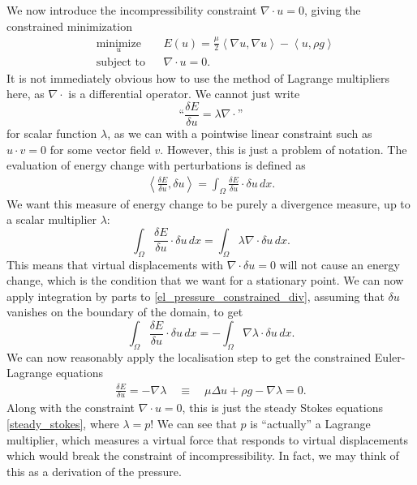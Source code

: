 \documentclass[11pt,a4paper]{memoir}
\newcommand{\inner}[1]{\left<#1\right>}
\newcommand{\om}{{\Omega}}
\begin{document}
We now introduce the incompressibility constraint $\nabla \cdot u = 0$, giving the constrained minimization
\begin{equation}\label{stokes_flow_optimization}
\begin{aligned}
& \underset{u}{\text{minimize}}
& & E(u) =  \frac{\mu}{2} \inner{\nabla u, \nabla u} - \inner{u, \rho g}\\
& \text{subject to}
& & \nabla\cdot u = 0.
\end{aligned}
\end{equation}
It is not immediately obvious how to use the method of Lagrange multipliers here, as $\nabla\cdot$ is a differential operator.
We cannot just write
    $$\text{``}\frac{\delta E}{\delta u} = \lambda\nabla\cdot\text{''}$$
for scalar function $\lambda$, as we can with a pointwise linear constraint such as $u\cdot v = 0$ for some vector field $v$. However, this is just a problem of
notation. The evaluation of energy change with perturbations is defined as
\begin{align*}
    \inner{\frac{\delta E}{\delta u}, \delta u} = \int_\Omega \frac{\delta E}{\delta u}\cdot\delta u\,dx.
\end{align*}
We want this measure of energy change to be purely a divergence measure, up to a scalar multiplier $\lambda$:
\begin{equation}\label{el_pressure_constrained_div}
    \int_\Omega \frac{\delta E}{\delta u}\cdot\delta u\,dx = \int_\om \lambda \nabla\cdot \delta u\,dx.
\end{equation}
This means
that virtual displacements with $\nabla\cdot\delta u = 0$ will not cause an energy change, which is the condition that
we want for a stationary point.
We can now apply integration by parts to \eqref{el_pressure_constrained_div}, assuming that $\delta u$ vanishes on the boundary of the domain, to get
\begin{equation}
    \int_\Omega \frac{\delta E}{\delta u}\cdot\delta u\,dx = -\int_\om \nabla\lambda \cdot \delta u\,dx.
\end{equation}
We can now reasonably apply the localisation step to get the constrained Euler-Lagrange equations
\begin{equation}
\begin{split}
           \frac{\delta E}{\delta u} = -\nabla \lambda
    \quad\equiv\quad \mu\Delta u + \rho g - \nabla \lambda = 0.
\end{split}
\end{equation}
Along with the constraint $\nabla\cdot u = 0$, this is just the steady Stokes equations \eqref{steady_stokes}, where $\lambda = p$! We can see that $p$ is ``actually''
a Lagrange multiplier, which measures a virtual force that responds to virtual displacements which would break the constraint of incompressibility.
In fact, we may think of this as a derivation of the pressure.
\end{document}

